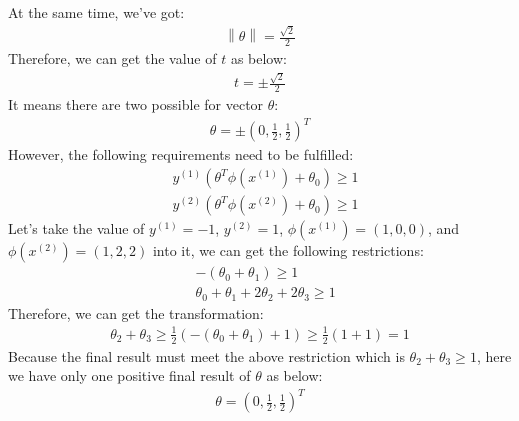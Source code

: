 \documentclass[paper=a4, fontsize=11pt]{scrartcl} %
\numberwithin{equation}{section} %
\numberwithin{figure}{section} %
\numberwithin{table}{section} %
\begin{document}
At the same time, we've got:
\begin{align*}
\left \| \theta  \right \|=\frac{\sqrt{2}}{2}
\end{align*}
Therefore, we can get the value of $t$ as below:
\begin{align*}
t=\pm \frac{\sqrt{2}}{2} 
\end{align*}
It means there are two possible for vector $\theta$:
\begin{align*}
\theta =\pm \left ( 0, \frac{1}{2}, \frac{1}{2} \right ) ^{T}
\end{align*}
However, the following requirements need to be fulfilled:
\begin{align*}
&y^{\left ( 1 \right )}\left ( \theta ^{T}\phi \left ( x^{\left ( 1 \right )} \right )+\theta _{0} \right )\geq 1
\\ &y^{\left ( 2 \right )}\left ( \theta ^{T}\phi \left ( x^{\left ( 2 \right )} \right )+\theta _{0} \right )\geq 1
\end{align*}
Let's take the value of $y^{\left ( 1 \right )}=-1$, $y^{\left ( 2 \right )}=1$, $\phi \left ( x^{\left ( 1 \right )} \right )=\left ( 1,0,0 \right )$, and $\phi \left ( x^{\left ( 2 \right )} \right )=\left ( 1,2,2 \right )$ into it, we can get the following restrictions:
\begin{align*}
&-\left ( \theta _{0}+\theta _{1} \right )\geq 1
\\ &\theta _{0}+\theta _{1}+2\theta _{2}+2\theta _{3}\geq 1
\end{align*}
Therefore, we can get the transformation:
\begin{align*}
\theta _{2}+\theta _{3}\geq \frac{1}{2}\left ( -\left (  \theta _{0}+\theta _{1}\right ) +1\right )\geq \frac{1}{2}\left ( 1+1 \right )=1
\end{align*}
Because the final result must meet the above restriction which is $\theta _{2}+\theta _{3}\geq1$, here we have only one positive final result of $\theta$ as below:
\begin{align*}
\theta =\left ( 0, \frac{1}{2}, \frac{1}{2} \right ) ^{T}
\end{align*}
\end{document}
